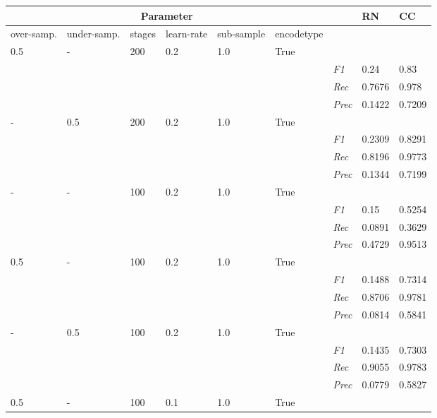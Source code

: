     \begin{table}[]
    \tiny
    \tabcolsep=0.11cm
    \begin{tabularx}{\textwidth}{XXXXXX|X|X|X}
    \toprule
    \multicolumn{6}{c}{Parameter} & & RN &  CC \\ \midrule
    over-\newline samp. & under-\newline samp. & stages &learn-\newline rate & sub-\newline sample & encode\newline type & & &  \\ \midrule
    0.5 & - & 200 & 0.2 & 1.0 &True & & &  \\
    & & & & & & \textit{F1} & 0.24 & 0.83        \\
    & & & & & & \textit{Rec} &  0.7676 & 0.978    \\
    & & & & & & \textit{Prec} & 0.1422 & 0.7209  \\ \midrule
    - & 0.5 & 200 & 0.2 & 1.0 &True & & &  \\
    & & & & & & \textit{F1} & 0.2309 & 0.8291        \\
    & & & & & & \textit{Rec} &  0.8196 & 0.9773    \\
    & & & & & & \textit{Prec} & 0.1344 & 0.7199  \\ \midrule
    - & - & 100 & 0.2 & 1.0 &True & & &  \\
    & & & & & & \textit{F1} & 0.15 & 0.5254        \\
    & & & & & & \textit{Rec} &  0.0891 & 0.3629    \\
    & & & & & & \textit{Prec} & 0.4729 & 0.9513  \\ \midrule
    0.5 & - & 100 & 0.2 & 1.0 &True & & &  \\
    & & & & & & \textit{F1} & 0.1488 & 0.7314        \\
    & & & & & & \textit{Rec} &  0.8706 & 0.9781    \\
    & & & & & & \textit{Prec} & 0.0814 & 0.5841  \\ \midrule
    - & 0.5 & 100 & 0.2 & 1.0 &True & & &  \\
    & & & & & & \textit{F1} & 0.1435 & 0.7303        \\
    & & & & & & \textit{Rec} &  0.9055 & 0.9783    \\
    & & & & & & \textit{Prec} & 0.0779 & 0.5827  \\ \midrule
    0.5 & - & 100 & 0.1 & 1.0 &True & & &  \\

\end{tabularx}
\end{table}
